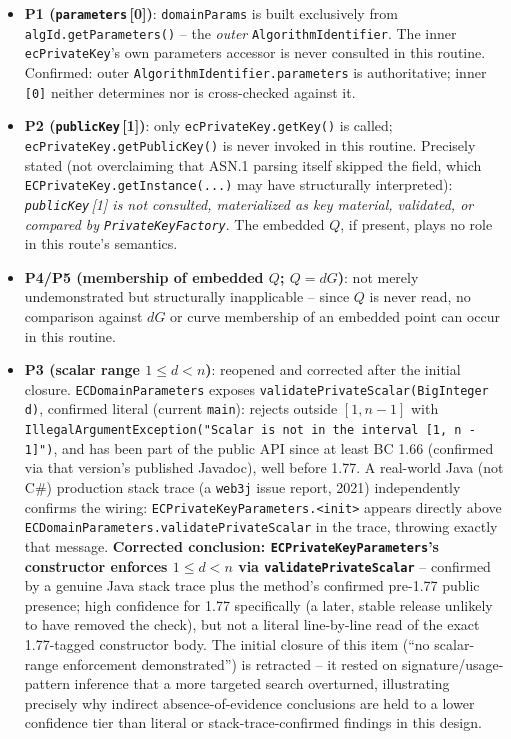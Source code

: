 \documentclass[11pt,a4paper]{article}
\begin{document}
\begin{itemize}
\item \textbf{P1 (\texttt{parameters}\,[0])}: \texttt{domainParams} is built exclusively from \texttt{algId.getParameters()} -- the \emph{outer} \texttt{AlgorithmIdentifier}. The inner \texttt{ecPrivateKey}'s own parameters accessor is never consulted in this routine. Confirmed: outer \texttt{AlgorithmIdentifier.parameters} is authoritative; inner \texttt{[0]} neither determines nor is cross-checked against it.
\item \textbf{P2 (\texttt{publicKey}\,[1])}: only \texttt{ecPrivateKey.getKey()} is called; \texttt{ecPrivateKey.getPublicKey()} is never invoked in this routine. Precisely stated (not overclaiming that ASN.1 parsing itself skipped the field, which \texttt{ECPrivateKey.getInstance(...)} may have structurally interpreted): \emph{\texttt{publicKey}\,[1] is not consulted, materialized as key material, validated, or compared by \texttt{PrivateKeyFactory}}. The embedded $Q$, if present, plays no role in this route's semantics.
\item \textbf{P4/P5 (membership of embedded $Q$; $Q=dG$)}: not merely undemonstrated but structurally inapplicable -- since $Q$ is never read, no comparison against $dG$ or curve membership of an embedded point can occur in this routine.
\item \textbf{P3 (scalar range $1\le d<n$)}: reopened and corrected after the initial closure. \texttt{ECDomainParameters} exposes \texttt{validatePrivateScalar(BigInteger d)}, confirmed literal (current \texttt{main}): rejects outside $[1,n-1]$ with \texttt{IllegalArgumentException("Scalar is not in the interval [1, n - 1]")}, and has been part of the public API since at least BC 1.66 (confirmed via that version's published Javadoc), well before 1.77. A real-world Java (not C\#) production stack trace (a \texttt{web3j} issue report, 2021) independently confirms the wiring: \texttt{ECPrivateKeyParameters.<init>} appears directly above \texttt{ECDomainParameters.validatePrivateScalar} in the trace, throwing exactly that message. \textbf{Corrected conclusion: \texttt{ECPrivateKeyParameters}'s constructor enforces $1\le d<n$ via \texttt{validatePrivateScalar}} -- confirmed by a genuine Java stack trace plus the method's confirmed pre-1.77 public presence; high confidence for 1.77 specifically (a later, stable release unlikely to have removed the check), but not a literal line-by-line read of the exact 1.77-tagged constructor body. The initial closure of this item (``no scalar-range enforcement demonstrated'') is retracted -- it rested on signature/usage-pattern inference that a more targeted search overturned, illustrating precisely why indirect absence-of-evidence conclusions are held to a lower confidence tier than literal or stack-trace-confirmed findings in this design.
\end{itemize}
\end{document}
